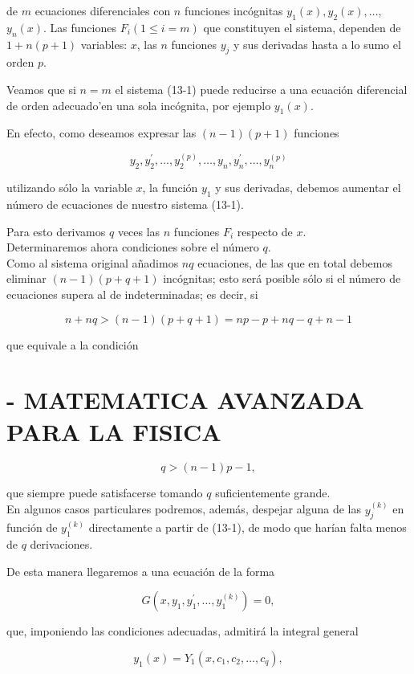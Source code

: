 \documentclass[10pt]{article}
\theoremstyle{plain}
\theoremstyle{definition}
\theoremstyle{remark}
\begin{document}
de $m$ ecuaciones diferenciales con $n$ funciones incógnitas $y_{1}(x), y_{2}(x), \ldots$, $y_{n}(x)$. Las funciones $F_{i}(1 \leqslant i=m)$ que constituyen el sistema, dependen de $1+n(p+1)$ variables: $x$, las $n$ funciones $y_{j}$ y sus derivadas hasta a lo sumo el orden $p$.

Veamos que si $n=m$ el sistema (13-1) puede reducirse a una ecuación diferencial de orden adecuado'en una sola incógnita, por ejemplo $y_{1}(x)$.

En efecto, como deseamos expresar las $(n-1)(p+1)$ funciones


\begin{equation*}
y_{2}, y_{2}^{\prime}, \ldots, y_{2}^{(p)}, \ldots, y_{n}, y_{n}^{\prime}, \ldots, y_{n}^{(p)} \tag{13-2}
\end{equation*}


utilizando sólo la variable $x$, la función $y_{1}$ y sus derivadas, debemos aumentar el número de ecuaciones de nuestro sistema (13-1).

Para esto derivamos $q$ veces las $n$ funciones $F_{i}$ respecto de $x$.\\
Determinaremos ahora condiciones sobre el número $q$.\\
Como al sistema original añadimos $n q$ ecuaciones, de las que en total debemos eliminar $(n-1)(p+q+1)$ incógnitas; esto será posible sólo si el número de ecuaciones supera al de indeterminadas; es decir, si

$$
n+n q>(n-1)(p+q+1)=n p-p+n q-q+n-1
$$

que equivale a la condición

\section*{- MATEMATICA AVANZADA PARA LA FISICA}
$$
q>(n-1) p-1,
$$

que siempre puede satisfacerse tomando $q$ suficientemente grande.\\
En algunos casos particulares podremos, además, despejar alguna de las $y_{j}^{(k)}$ en función de $y_{1}^{(k)}$ directamente a partir de (13-1), de modo que harían falta menos de $q$ derivaciones.

De esta manera llegaremos a una ecuación de la forma

$$
G\left(x, y_{1}, y_{1}^{\prime}, \ldots, y_{1}^{(k)}\right)=0,
$$

que, imponiendo las condiciones adecuadas, admitirá la integral general

$$
y_{1}(x)=Y_{1}\left(x, c_{1}, c_{2}, \ldots, c_{q}\right),
$$
\end{document}
